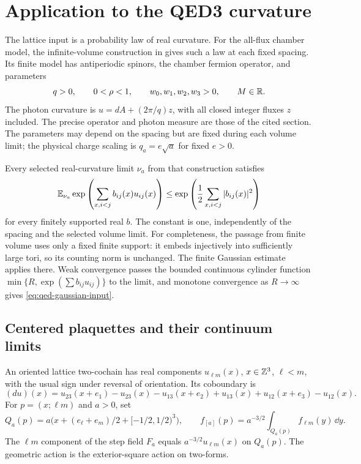 \section{Application to the QED3 curvature}\label{sec:qed}
The lattice input is a probability law of real curvature.
For the all-flux chamber model, the infinite-volume construction
in \cite[Theorem~A(i) and Section~2]{ChamberLattice} gives such a
law at each fixed spacing. Its finite model has antiperiodic
spinors, the chamber fermion operator, and parameters
\[
 q>0,\qquad 0<\rho<1,\qquad w_0,w_1,w_2,w_3>0,\qquad M\in\mathbb R.
\]
The photon curvature is $u=dA+(2\pi/q)z$, with all closed
integer fluxes $z$ included. The precise operator and photon
measure are those of the cited section. The parameters may
depend on the spacing but are fixed during each volume limit;
the physical charge scaling is $q_a=e\sqrt a$ for fixed $e>0$.

Every selected real-curvature limit $\nu_a$ from that construction
satisfies
\begin{equation}\label{eq:qed-gaussian-input}
 \mathbb E_{\nu_a}\exp\left(\sum_{x,i<j}b_{ij}(x)u_{ij}(x)\right)
 \le\exp\left(\frac12\sum_{x,i<j}|b_{ij}(x)|^2\right)
\end{equation}
for every finitely supported real $b$. The constant is one,
independently of the spacing and the selected volume limit.
For completeness, the passage from finite volume uses only a
fixed finite support: it embeds injectively into sufficiently
large tori, so its counting norm is unchanged. The finite Gaussian
estimate \cite[Proposition~5.1]{ChamberLattice} applies there.
Weak convergence passes the bounded continuous cylinder
function $\min\{R,\exp(\sum b_{ij}u_{ij})\}$ to the limit,
and monotone convergence as $R\to\infty$ gives
\eqref{eq:qed-gaussian-input}.

\subsection{Centered plaquettes and their continuum limits}\label{sec:plaquettes}
An oriented lattice two-cochain has real components
\(u_{\ell m}(x)\), \(x\in\mathbb Z^3\), \(\ell<m\), with the usual sign
under reversal of orientation. Its coboundary is
\[
 (du)(x)=u_{23}(x+e_1)-u_{23}(x)
        -u_{13}(x+e_2)+u_{13}(x)
        +u_{12}(x+e_3)-u_{12}(x).
\]
For \(p=(x;\ell m)\) and \(a>0\), set
\begin{equation}\label{eq:plaquette-cells}
 Q_a(p)=a\bigl(x+(e_\ell+e_m)/2+[-1/2,1/2)^3\bigr),\qquad
 f_{[a]}(p)=a^{-3/2}\int_{Q_a(p)}f_{\ell m}(y)\,\dd y.
\end{equation}
The \(\ell m\) component of the step field \(F_a\) equals
\(a^{-3/2}u_{\ell m}(x)\) on \(Q_a(p)\).
The geometric action is the exterior-square action on two-forms.



